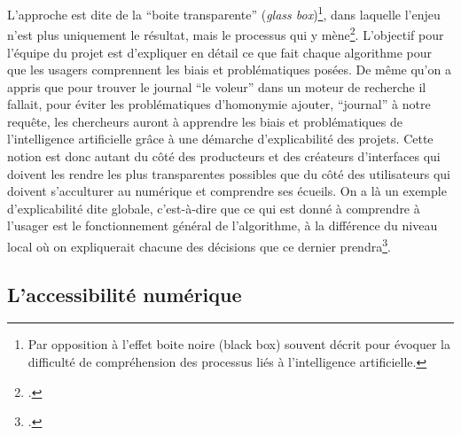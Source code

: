 L’approche est dite de la \enquote{boite transparente} (\textit{glass box})\footnote{Par opposition à l’effet boite noire (black box) souvent décrit pour évoquer la difficulté de compréhension des processus liés à l’intelligence artificielle.}, dans laquelle l’enjeu n’est plus uniquement le résultat, mais le processus qui y mène\footcite[p. 47]{besnehard_evaluer_nodate}. L’objectif pour l’équipe du projet est d’expliquer en détail ce que fait chaque algorithme pour que les usagers comprennent les biais et problématiques posées. De même qu’on a appris que pour trouver le journal \enquote{le voleur} dans un moteur de recherche il fallait, pour éviter les problématiques d’homonymie ajouter, \enquote{journal} à notre requête, les chercheurs auront à apprendre les biais et problématiques de l’intelligence artificielle grâce à une démarche d’explicabilité des projets. Cette notion est donc autant du côté des producteurs et des créateurs d’interfaces qui doivent les rendre les plus transparentes possibles que du côté des utilisateurs qui doivent s’acculturer au numérique et comprendre ses écueils. On a là un exemple d’explicabilité dite globale, c’est-à-dire que ce qui est donné à comprendre à l’usager est le fonctionnement général de l’algorithme, à la différence du niveau local où on expliquerait chacune des décisions que ce dernier prendra\footcite[p. 15]{maxwell_comment_2020}.

\subsection{L'accessibilité numérique}

